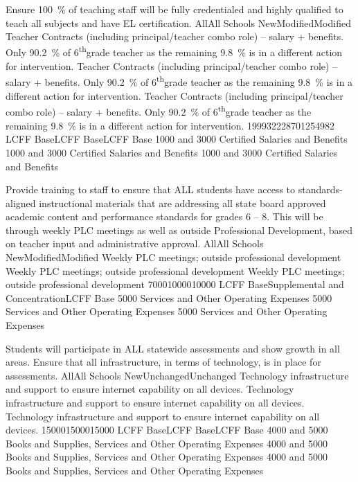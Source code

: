 \documentclass{article}
\newcommand{\supth}{\textsuperscript{th}}
\newcounter{goal}[section] %
\newcounter{action}[goal]
\begin{document}
\begin{planactions}
	\planaction
	{Ensure \SI{100}{\percent} of teaching staff will be fully credentialed and highly qualified to teach all subjects and have EL certification.}
	\planaction@scope
	{All}{All Schools}
	\planaction@action
	{New}{Modified}{Modified}
	{Teacher Contracts (including principal/teacher combo role) -- salary + benefits. Only \SI{90.2}{\percent} of 6\supth grade teacher as the remaining \SI{9.8}{\percent} is in a different action for intervention.}
	{Teacher Contracts (including principal/teacher combo role) -- salary + benefits. Only \SI{90.2}{\percent} of 6\supth grade teacher as the remaining \SI{9.8}{\percent} is in a different action for intervention.}
	{Teacher Contracts (including principal/teacher combo role) -- salary + benefits. Only \SI{90.2}{\percent} of 6\supth grade teacher as the remaining \SI{9.8}{\percent} is in a different action for intervention.}
	\planaction@budget
	{199932}{228701}{254982}
	{LCFF Base}{LCFF Base}{LCFF Base}
	{\num{1000} and \num{3000} Certified Salaries and Benefits}
	{\num{1000} and \num{3000} Certified Salaries and Benefits}
	{\num{1000} and \num{3000} Certified Salaries and Benefits}

	\planaction
	{Provide training to staff to ensure that ALL students have access to standards-aligned instructional materials that are addressing all state board approved academic content and performance standards for grades 6 -- 8. This will be through weekly PLC meetings as well as outside Professional Development, based on teacher input and administrative approval.}
	\planaction@scope
	{All}{All Schools}
	\planaction@action
	{New}{Modified}{Modified}
	{Weekly PLC meetings; outside professional development}
	{Weekly PLC meetings; outside professional development}
	{Weekly PLC meetings; outside professional development}
	\planaction@budget
	{7000}{10000}{10000}
	{LCFF Base}{Supplemental and Concentration}{LCFF Base}
	{\num{5000} Services and Other Operating Expenses}
	{\num{5000} Services and Other Operating Expenses}
	{\num{5000} Services and Other Operating Expenses}
	
	\planaction
	{Students will participate in ALL statewide assessments and show growth in all areas. Ensure that all infrastructure, in terms of technology, is in place for assessments.}
	\planaction@scope
	{All}{All Schools}
	\planaction@action
	{New}{Unchanged}{Unchanged}
	{Technology infrastructure and support to ensure internet capability on all devices.}
	{Technology infrastructure and support to ensure internet capability on all devices.}
	{Technology infrastructure and support to ensure internet capability on all devices.}
	\planaction@budget
	{15000}{15000}{15000}
	{LCFF Base}{LCFF Base}{LCFF Base}
	{\num{4000} and \num{5000} Books and Supplies, Services and Other Operating Expenses}
	{\num{4000} and \num{5000} Books and Supplies, Services and Other Operating Expenses}
	{\num{4000} and \num{5000} Books and Supplies, Services and Other Operating Expenses}


\end{planactions}
\end{document}
